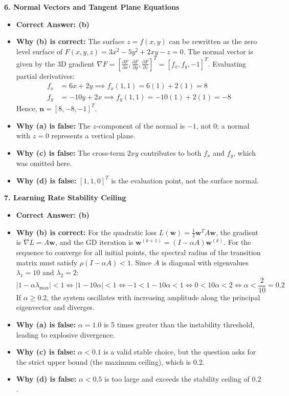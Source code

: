\textbf{6. Normal Vectors and Tangent Plane Equations}
\begin{itemize}
    \item \textbf{Correct Answer: (b)}
    \item \textbf{Why (b) is correct:} The surface $z = f(x, y)$ can be rewritten as the zero level surface of $F(x, y, z) = 3x^2 - 5y^2 + 2xy - z = 0$. The normal vector is given by the 3D gradient $\nabla F = \left[ \frac{\partial F}{\partial x}, \frac{\partial F}{\partial y}, \frac{\partial F}{\partial z} \right]^T = [f_x, f_y, -1]^T$.
    Evaluating partial derivatives:
    \begin{align*}
    f_x &= 6x + 2y \implies f_x(1, 1) = 6(1) + 2(1) = 8 \\
    f_y &= -10y + 2x \implies f_y(1, 1) = -10(1) + 2(1) = -8
    \end{align*}
    Hence, $\mathbf{n} = [8, -8, -1]^T$.
    \item \textbf{Why (a) is false:} The $z$-component of the normal is $-1$, not 0; a normal with $z = 0$ represents a vertical plane.
    \item \textbf{Why (c) is false:} The cross-term $2xy$ contributes to both $f_x$ and $f_y$, which was omitted here.
    \item \textbf{Why (d) is false:} $[1, 1, 0]^T$ is the evaluation point, not the surface normal.
\end{itemize}

\textbf{7. Learning Rate Stability Ceiling}
\begin{itemize}
    \item \textbf{Correct Answer: (b)}
    \item \textbf{Why (b) is correct:} For the quadratic loss $L(\mathbf{w}) = \frac{1}{2}\mathbf{w}^T A \mathbf{w}$, the gradient is $\nabla L = A\mathbf{w}$, and the GD iteration is $\mathbf{w}^{(k+1)} = (I - \alpha A)\mathbf{w}^{(k)}$.
    For the sequence to converge for all initial points, the spectral radius of the transition matrix must satisfy $\rho(I - \alpha A) < 1$.
    Since $A$ is diagonal with eigenvalues $\lambda_1 = 10$ and $\lambda_2 = 2$:
    \begin{equation*}
    |1 - \alpha \lambda_{\max}| < 1 \iff |1 - 10\alpha| < 1 \iff -1 < 1 - 10\alpha < 1 \iff 0 < 10\alpha < 2 \iff \alpha < \frac{2}{10} = \mathbf{0.2}
    \end{equation*}
    If $\alpha \ge 0.2$, the system oscillates with increasing amplitude along the principal eigenvector and diverges.
    \item \textbf{Why (a) is false:} $\alpha = 1.0$ is 5 times greater than the instability threshold, leading to explosive divergence.
    \item \textbf{Why (c) is false:} $\alpha < 0.1$ is a valid stable choice, but the question asks for the strict upper bound (the maximum ceiling), which is $0.2$.
    \item \textbf{Why (d) is false:} $\alpha < 0.5$ is too large and exceeds the stability ceiling of $0.2$.
\end{itemize}

